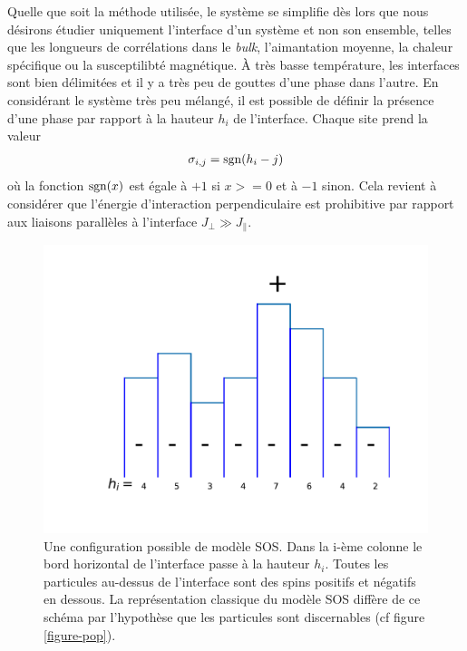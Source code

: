 Quelle que soit la méthode utilisée, le système se simplifie dès lors que nous désirons étudier uniquement l'interface d'un système et non son ensemble, telles que les longueurs de corrélations dans le \textit{bulk}, l'aimantation moyenne, la chaleur spécifique ou la susceptilibté magnétique. À très basse température, les interfaces sont bien délimitées et il y a très peu de gouttes d'une phase dans l'autre. En considérant le système très peu mélangé, il est possible de définir la présence d'une phase par rapport à la hauteur $h_i$ de l'interface. Chaque site prend la valeur
\begin{align*}
	\sigma_{i,j} = \operatorname{sgn}(h_i-j)
\end{align*}
où la fonction $\operatorname{sgn}(x)$ est égale à $+1$ si $x>=0$ et à $-1$ sinon. Cela revient à considérer que l'énergie d'interaction perpendiculaire est prohibitive par rapport aux liaisons parallèles à l'interface $J_\perp \gg J_\parallel$. 

\begin{figure}
	\centering
	\includegraphics[scale=1]{isingtosos/sos-indiscernable.pdf}
	\caption{Une configuration possible de modèle SOS. Dans la i-ème colonne le bord horizontal de l'interface passe à la hauteur $h_i$. Toutes les particules au-dessus de l'interface sont des spins positifs et négatifs en dessous. La représentation classique du modèle SOS diffère de ce schéma par l'hypothèse que les particules sont discernables (cf figure \ref{figure-pop}).}
    \label{figure-sos}
\end{figure}


